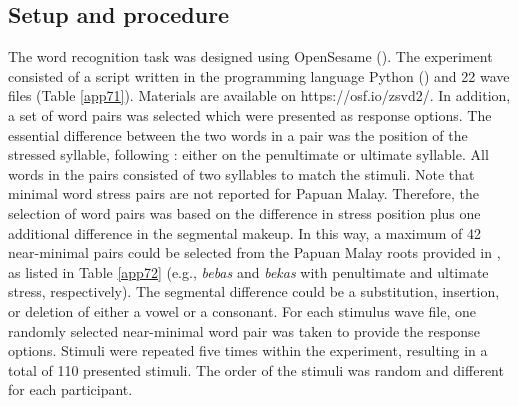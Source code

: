 \subsection{Setup and procedure}
The word recognition task was designed using OpenSesame (\citealt{mathot_opensesame_2012}). The experiment consisted of a script written in the programming language Python (\citealt{vanrossum_interactively_1991}) and 22 wave files (Table \ref{app71}). Materials are available on https://osf.io/zsvd2/. In addition, a set of word pairs was selected which were presented as response options. The essential difference between the two words in a pair was the position of the stressed syllable, following \citet{kluge_grammar_2017}: either on the penultimate or ultimate syllable. All words in the pairs consisted of two syllables to match the stimuli. Note that minimal word stress pairs are not reported for Papuan Malay. Therefore, the selection of word pairs was based on the difference in stress position plus one additional difference in the segmental makeup. In this way, a maximum of 42 near-minimal pairs could be selected from the Papuan Malay roots provided in \citet{kluge_grammar_2017}, as listed in Table \ref{app72} (e.g., \textit{bebas} and \textit{bekas} with penultimate and ultimate stress, respectively). The segmental difference could be a substitution, insertion, or deletion of either a vowel or a consonant. For each stimulus wave file, one randomly selected near-minimal word pair was taken to provide the response options. Stimuli were repeated five times within the experiment, resulting in a total of 110 presented stimuli. The order of the stimuli was random and different for each participant.

